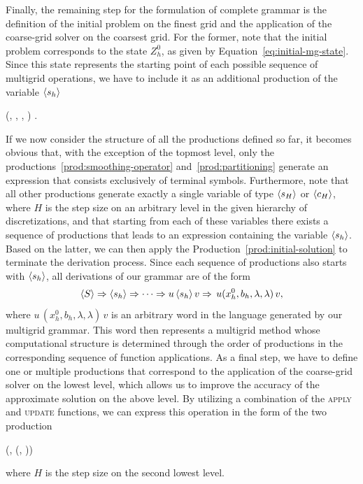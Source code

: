 Finally, the remaining step for the formulation of complete grammar is the definition of the initial problem on the finest grid and the application of the coarse-grid solver on the coarsest grid.
For the former, note that the initial problem corresponds to the state $Z_h^0$, as given by Equation~\eqref{eq:initial-mg-state}.
Since this state represents the starting point of each possible sequence of multigrid operations, we have to include it as an additional production of the variable $\langle s_h \rangle$
\begin{production}
	 {
	 (, , \bnfes, \bnfes)
	}.
\label{prod:initial-solution}
\end{production}If we now consider the structure of all the productions defined so far, it becomes obvious that, with the exception of the topmost level, only the productions~\eqref{prod:smoothing-operator} and~\eqref{prod:partitioning} generate an expression that consists exclusively of terminal symbols.
Furthermore, note that all other productions generate exactly a single variable of type $\langle s_H \rangle$ or $\langle c_H \rangle$, where $H$ is the step size on an arbitrary level in the given hierarchy of discretizations, and that starting from each of these variables there exists a sequence of productions that leads to an expression containing the variable $\langle s_h \rangle$.
Based on the latter, we can then apply the Production~\eqref{prod:initial-solution} to terminate the derivation process.
Since each sequence of productions also starts with $\langle s_h \rangle$, all derivations of our grammar are of the form
\begin{equation*}
	\langle S \rangle \Rightarrow \langle s_h \rangle \Rightarrow \dots \Rightarrow u \, \langle s_h \rangle \, v \Rightarrow \, u (x_h^0, b_h, \lambda, \lambda) \, v,
\end{equation*}
where $u  \, (x_h^0, b_h, \lambda, \lambda) \, v$ is an arbitrary word in the language generated by our multigrid grammar.
This word then represents a multigrid method whose computational structure is determined through the order of productions in the corresponding sequence of function applications.
As a final step, we have to define one or multiple productions that correspond to the application of the coarse-grid solver on the lowest level, which allows us to improve the accuracy of the approximate solution on the above level.
By utilizing a combination of the \textsc{apply} and \textsc{update} functions, we can express this operation in the form of the two production
\begin{production}
	 {
		(, \bnfsp {}(, \bnfsp{}))
  \label{prod:coarse-grid-solver}
	}  \\
\end{production}where $H$ is the step size on the second lowest level.
